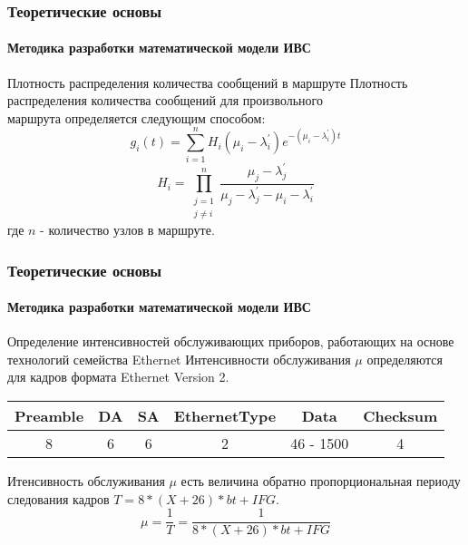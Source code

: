 \documentclass[aspectratio=169]{beamer}
\begin{document}
\begin{frame}
\frametitle{Теоретические основы}
\framesubtitle{Методика разработки математической модели ИВС}

\begin{block}{Плотность распределения количества сообщений в маршруте}
Плотность распределения количества сообщений для произвольного \\ маршрута определяется следующим способом:
\[ g_{i} (t) = \sum\limits_{i = 1}^{n} H_{i} (\mu_{i} - \lambda_{i}^{'}) e^{ -(\mu_{i} - \lambda_{i}^{'}) t } \]
\[ H_{i} = \prod\limits_{ \substack{ j = 1 \\ j \neq i } }^{n} \frac{ \mu_{j} - \lambda_{j}^{'} }{ \mu_{j} - \lambda_{j}^{'} - \mu_{i} - \lambda_{i}^{'} } \]
где \( n \) - количество узлов в маршруте.
\end{block}
\end{frame}

\begin{frame}
\frametitle{Теоретические основы}
\framesubtitle{Методика разработки математической модели ИВС}

\begin{block}{Определение интенсивностей обслуживающих приборов, работающих на основе технологий семейства Ethernet}
Интенсивности обслуживания \( \mu \) определяются для кадров формата Ethernet Version 2.

\begin{table}[h!]
\begin{tabular}{|c|c|c|c|c|c|}
\hline Preamble & DA & SA & EthernetType & Data & Checksum \\
\hline 8 & 6 & 6 & 2 & 46 - 1500 & 4 \\
\hline
\end{tabular}
\end{table}

Итенсивность обслуживания \( \mu \) есть величина обратно пропорциональная периоду следования кадров \( T = 8 * (X + 26) * bt + IFG \).
\[ \mu = \frac{1}{T} = \frac{1}{ 8 * (X + 26) * bt + IFG } \]
\end{block}
\end{frame}
\end{document}
